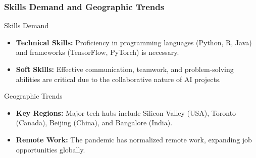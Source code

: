 \documentclass{beamer}
\begin{document}
\begin{frame}[fragile]
    \frametitle{Skills Demand and Geographic Trends}
    
    \begin{block}{Skills Demand}
        \begin{itemize}
            \item \textbf{Technical Skills:}
                Proficiency in programming languages (Python, R, Java) and frameworks (TensorFlow, PyTorch) is necessary.
                
            \item \textbf{Soft Skills:}
                Effective communication, teamwork, and problem-solving abilities are critical due to the collaborative nature of AI projects.
        \end{itemize}
    \end{block}
    
    \begin{block}{Geographic Trends}
        \begin{itemize}
            \item \textbf{Key Regions:} 
                Major tech hubs include Silicon Valley (USA), Toronto (Canada), Beijing (China), and Bangalore (India).
                
            \item \textbf{Remote Work:} 
                The pandemic has normalized remote work, expanding job opportunities globally.
        \end{itemize}
    \end{block}
\end{frame}
\end{document}
